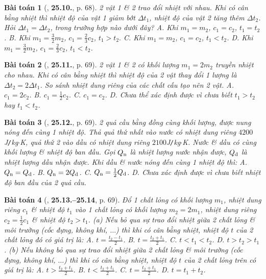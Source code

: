 \documentclass{article}
\numberwithin{equation}{section}
\newtheorem{baitoan}{Bài toán}
\begin{document}
\begin{baitoan}[\cite{SBT_Vat_Ly_8}, \textbf{25.10.}, p. 68]
	2 vật 1 \& 2 trao đổi nhiệt với nhau. Khi có cân bằng nhiệt thì nhiệt độ của vật 1 giảm bớt $\Delta t_1$, nhiệt độ của vật 2 tăng thêm $\Delta t_2$. Hỏi $\Delta t_1 = \Delta t_2$, trong trường hợp nào dưới đây? {\sf A.} Khi $m_1 = m_2$, $c_1 = c_2$, $t_1 = t_2$. {\sf B.} Khi $m_1  = \frac{3}{2}m_2$, $c_1 = \frac{2}{3}c_2$, $t_1 > t_2.$ {\sf C.} Khi $m_1 = m_2$, $c_1 = c_2$, $t_1 < t_2$. {\sf D.} Khi $m_1 = \frac{3}{2}m_2$, $c_1 = \frac{2}{3}c_2$, $t_1 < t_2$.
\end{baitoan}

\begin{baitoan}[\cite{SBT_Vat_Ly_8}, \textbf{25.11.}, p. 69]
	2 vật 1 \& 2 có khối lượng $m_1 = 2m_2$ truyền nhiệt cho nhau. Khi có cân bằng nhiệt thì nhiệt độ của 2 vật thay đổi 1 lượng là $\Delta t_2 = 2\Delta t_1$. So sánh nhiệt dung riêng của các chất cấu tạo nên 2 vật. {\sf A.} $c_1 = 2c_2$. {\sf B.} $c_1 = \frac{1}{2}c_2$. {\sf C.} $c_1 = c_2$. {\sf D.} Chưa thể xác định được vì chưa biết $t_1 > t_2$ hay $t_1 < t_2$.
\end{baitoan}

\begin{baitoan}[\cite{SBT_Vat_Ly_8}, \textbf{25.12.}, p. 69]
	2 quả cầu bằng đồng cùng khối lượng, được nung nóng đến cùng 1 nhiệt độ. Thả quả thứ nhất vào nước có nhiệt dung riêng $4200$\emph{J\texttt{/}kg$\cdot$K}, quả thứ 2 vào dầu có nhiệt dung riêng $2100$\emph{J\texttt{/}kg$\cdot$K}. Nước \& dầu có cùng khối lượng \& nhiệt độ ban đầu. Gọi $Q_{\rm n}$ là nhiệt lượng nước nhận được, $Q_{\rm d}$ là nhiệt lượng dầu nhận được. Khi dầu \& nước nóng đến cùng 1 nhiệt độ thì: {\sf A.} $Q_{\rm n} = Q_{\rm d}$. {\sf B.} $Q_{\rm n} = 2Q_{\rm d}$. {\sf C.} $Q_{\rm n} = \frac{1}{2}Q_{\rm d}$. {\sf D.} Chưa xác định được vì chưa biết nhiệt độ ban đầu của 2 quả cầu.
\end{baitoan}

\begin{baitoan}[\cite{SBT_Vat_Ly_8}, \textbf{25.13.--25.14}, p. 69]
	Đổ 1 chất lỏng có khối lượng $m_1$, nhiệt dung riêng $c_1$ \& nhiệt độ $t_1$ vào 1 chất lỏng có khối lượng $m_2 = 2m_1$, nhiệt dung riêng $c_2 = \frac{1}{2}c_1$ \& nhiệt độ $t_2 > t_1$. (a) Nếu bỏ qua sự trao đổi nhiệt giữa 2 chất lỏng \& môi trường (cốc đựng, không khí, $\ldots$) thì khi có cân bằng nhiệt, nhiệt độ $t$ của 2 chất lỏng đó có giá trị là: {\sf A.} $t = \frac{t_2 - t_1}{2}$. {\sf B.} $t = \frac{t_2 + t_1}{2}$. {\sf C.} $t < t_1 < t_2$. {\sf D.} $t > t_2 > t_1$. (b) Nếu không bỏ qua sự trao đổi nhiệt giữa 2 chất lỏng \& môi trường (cốc đựng, không khí, $\ldots$) thì khi có cân bằng nhiệt, nhiệt độ $t$ của 2 chất lỏng trên có giá trị là: {\sf A.} $t > \frac{t_2 + t_1}{2}$. {\sf B.} $t < \frac{t_2 + t_1}{2}$. {\sf C.} $t = \frac{t_2 + t_1}{2}$. {\sf D.} $t = t_1 + t_2$.
\end{baitoan}
\end{document}
